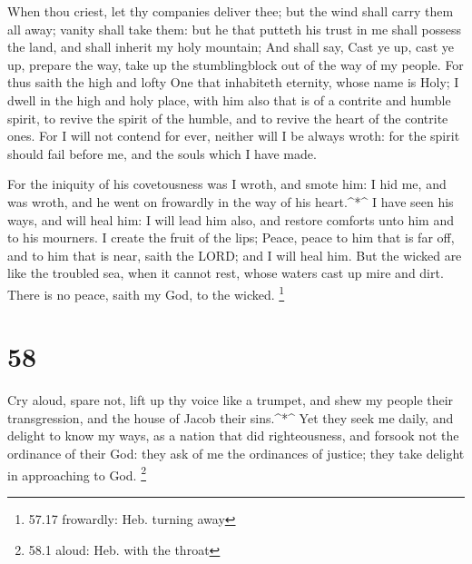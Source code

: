  When thou criest, let thy companies deliver thee; but the
wind shall carry them all away; vanity shall take them: but he that
putteth his trust in me shall possess the land, and shall inherit my
holy mountain;  And shall say, Cast ye up, cast ye up,
prepare the way, take up the stumblingblock out of the way of my people.
 For thus saith the high and lofty One that inhabiteth
eternity, whose name is Holy; I dwell in the high and holy place, with
him also that is of a contrite and humble spirit, to revive the spirit
of the humble, and to revive the heart of the contrite ones.
 For I will not contend for ever, neither will I be always
wroth: for the spirit should fail before me, and the souls which I have
made.

 For the iniquity of his covetousness was I wroth, and
smote him: I hid me, and was wroth, and he went on frowardly in the way
of his heart.\^{}*\^{}  I have seen his ways, and will heal
him: I will lead him also, and restore comforts unto him and to his
mourners.  I create the fruit of the lips; Peace, peace to
him that is far off, and to him that is near, saith the LORD; and I will
heal him.  But the wicked are like the troubled sea, when
it cannot rest, whose waters cast up mire and dirt.  There
is no peace, saith my God, to the wicked. \footnote{57.17 frowardly:
  Heb. turning away}

\hypertarget{section-57}{%
\section{58}\label{section-57}}

 Cry aloud, spare not, lift up thy voice like a trumpet, and
shew my people their transgression, and the house of Jacob their
sins.\^{}*\^{}  Yet they seek me daily, and delight to know
my ways, as a nation that did righteousness, and forsook not the
ordinance of their God: they ask of me the ordinances of justice; they
take delight in approaching to God. \footnote{58.1 aloud: Heb. with the
  throat}

